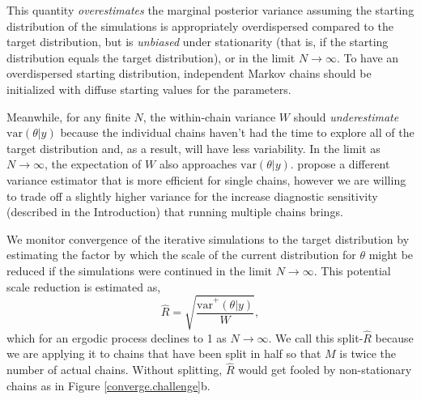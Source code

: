 \documentclass[american,]{article}
\begin{document}
This quantity \emph{overestimates} the marginal posterior variance
assuming the starting distribution of the simulations is appropriately
overdispersed compared to the target distribution, but is
\emph{unbiased} under stationarity (that is, if the starting
distribution equals the target distribution), or in the limit
\(N\rightarrow\infty\). To have an overdispersed starting distribution,
independent Markov chains should be initialized with diffuse starting
values for the parameters. 

Meanwhile, for any finite \(N\), the within-chain variance \(W\) should
\emph{underestimate} \(\mbox{var}(\theta |y)\) because the
individual chains haven't had the time to explore all of the target
distribution and, as a result, will have less variability. In the limit
as \(N\rightarrow\infty\), the expectation of \(W\) also approaches
\(\mbox{var}(\theta |y)\). \citet{vats2018revisiting} propose a different variance estimator that is more efficient for single chains, however we are willing to trade off a slightly higher variance for the increase diagnostic sensitivity (described in the Introduction) that running multiple chains brings.

We monitor convergence of the iterative simulations to the target
distribution by estimating the factor by which the scale of the current
distribution for \(\theta\) might be reduced if the simulations were
continued in the limit \(N\rightarrow\infty\). This potential scale
reduction is estimated as,
\begin{equation}
\widehat{R} = \sqrt{\frac{\widehat{\mbox{var}}^+(\theta | y)}{W}},
\end{equation}
which for an ergodic process declines to 1 as \(N\rightarrow\infty\). We call this
split-\(\widehat{R}\) because we are applying it to chains that
have been split in half so that \(M\) is twice the number of actual
chains. Without splitting, \(\widehat{R}\) would get fooled by
non-stationary chains as in Figure \ref{converge.challenge}b.

\end{document}
